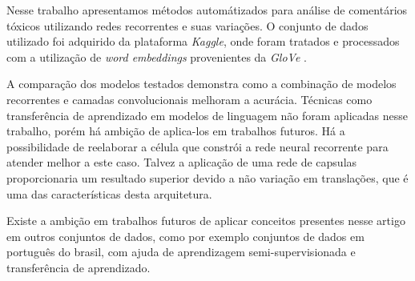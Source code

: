 \documentclass[12pt]{article}
\begin{document}
Nesse trabalho apresentamos métodos automátizados para análise de comentários tóxicos utilizando redes recorrentes e suas variações. O conjunto de dados utilizado foi adquirido da plataforma \textit{Kaggle}, onde foram tratados e processados com a utilização de \textit{word embeddings} provenientes da \textit{GloVe} \cite{pennington2014glove}.

A comparação dos modelos testados demonstra como a combinação de modelos recorrentes e camadas convolucionais melhoram a acurácia. Técnicas como transferência de aprendizado em modelos de linguagem não foram aplicadas nesse trabalho, porém há ambição de aplica-los em trabalhos futuros. Há a possibilidade de reelaborar a célula que constrói a rede neural recorrente para atender melhor a este caso. Talvez a aplicação de uma rede de capsulas \cite{DBLP:journals/corr/abs-1710-09829} proporcionaria um resultado superior devido a não variação em translações, que é uma das características desta arquitetura.

Existe a ambição em trabalhos futuros de aplicar conceitos presentes nesse artigo em outros conjuntos de dados, como por exemplo conjuntos de dados em português do brasil, com ajuda de aprendizagem semi-supervisionada e transferência de aprendizado.



\end{document}
